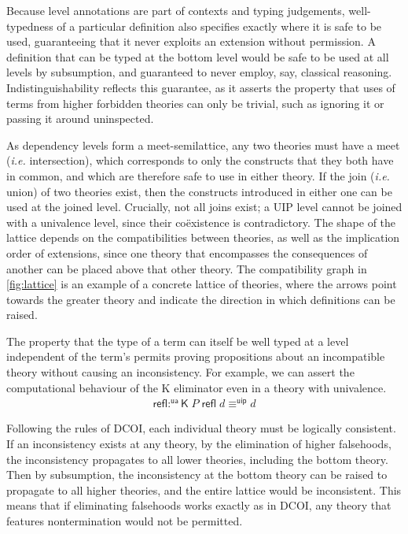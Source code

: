 \documentclass{article}
\makeatletter
\newcommand{\ie}{\textit{i.e.}\@\xspace}
\newcommand{\kw}[1]{\mathsf{#1}}
\makeatother
\begin{document}
Because level annotations are part of contexts and typing judgements,
well-typedness of a particular definition also specifies exactly where it is safe to be used,
guaranteeing that it never exploits an extension without permission.
A definition that can be typed at the bottom level
would be safe to be used at all levels by subsumption,
and guaranteed to never employ, say, classical reasoning.
Indistinguishability reflects this guarantee, as it asserts the property that
uses of terms from higher forbidden theories can only be trivial,
such as ignoring it or passing it around uninspected.

As dependency levels form a meet-semilattice,
any two theories must have a meet (\ie intersection),
which corresponds to only the constructs that they both have in common,
and which are therefore safe to use in either theory.
If the join (\ie union) of two theories exist,
then the constructs introduced in either one can be used at the joined level.
Crucially, not all joins exist; a UIP level cannot be joined with a univalence level,
since their co\"existence is contradictory.
The shape of the lattice depends on the compatibilities between theories,
as well as the implication order of extensions,
since one theory that encompasses the consequences of another
can be placed above that other theory.
The compatibility graph in \cref{fig:lattice}
is an example of a concrete lattice of theories,
where the arrows point towards the greater theory
and indicate the direction in which definitions can be raised.

The property that the type of a term can itself
be well typed at a level independent of the term's
permits proving propositions about an incompatible theory
without causing an inconsistency.
For example, we can assert the computational behaviour of the K eliminator
even in a theory with univalence.
%
\begin{align*}
  \kw{refl} :^{\kw{ua}} \kw{K} \; P \; \kw{refl} \; d \equiv^{\kw{uip}} d
\end{align*}
\vspace{-1.5\baselineskip}

Following the rules of DCOI,
each individual theory must be logically consistent.
If an inconsistency exists at any theory,
by the elimination of higher falsehoods,
the inconsistency propagates to all lower theories, including the bottom theory.
Then by subsumption, the inconsistency at the bottom theory
can be raised to propagate to all higher theories,
and the entire lattice would be inconsistent.
This means that if eliminating falsehoods works exactly as in DCOI,
any theory that features nontermination would not be permitted.
\end{document}
